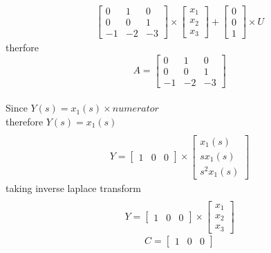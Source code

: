 \begin{enumerate}[label=\thesection.\arabic*.,ref=\thesection.\theenumi]
\begin{gather}
\begin{bmatrix}
0&1&0\\
0&0&1\\
-1&-2&-3
\end{bmatrix}\times \begin{bmatrix}
x_{1}\\
x_{2}\\
x_{3}
\end{bmatrix}
+
\begin{bmatrix}
0\\
0\\
1
\end{bmatrix} \times U
\end{gather}
therfore
\begin{equation}
A=\begin{bmatrix}
0&1&0\\
0&0&1\\
-1&-2&-3
\end{bmatrix}
\end{equation}
\\
Since $ Y(s)=x_{1}(s)\times numerator$
\\therefore $ Y(s)=x_{1}(s) $
\begin{gather}
\\Y=
\begin{bmatrix}
1&0&0
\end{bmatrix}\times \begin{bmatrix}
x_{1}(s)\\
sx_{1}(s)\\
s^2x_{1}(s)
\end{bmatrix} 
\end{gather}
taking inverse laplace transform
\begin{gather}
\\Y=
\begin{bmatrix}
1&0&0
\end{bmatrix}\times \begin{bmatrix}
x_{1}\\
x_{2}\\
x_{3}
\end{bmatrix} 
\end{gather}
\begin{equation}
C=\begin{bmatrix}
1&0&0
\end{bmatrix}
\end{equation}
%

%
\end{enumerate}

